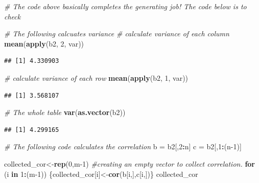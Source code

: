 \documentclass[]{book}
\newenvironment{Shaded}{\begin{snugshade}}{\end{snugshade}}
\newcommand{\CommentTok}[1]{\textcolor[rgb]{0.56,0.35,0.01}{\textit{#1}}}
\newcommand{\ControlFlowTok}[1]{\textcolor[rgb]{0.13,0.29,0.53}{\textbf{#1}}}
\newcommand{\DecValTok}[1]{\textcolor[rgb]{0.00,0.00,0.81}{#1}}
\newcommand{\KeywordTok}[1]{\textcolor[rgb]{0.13,0.29,0.53}{\textbf{#1}}}
\newcommand{\NormalTok}[1]{#1}
\newcommand{\OperatorTok}[1]{\textcolor[rgb]{0.81,0.36,0.00}{\textbf{#1}}}
\newcommand{\StringTok}[1]{\textcolor[rgb]{0.31,0.60,0.02}{#1}}
\begin{document}
\begin{Shaded}
\begin{Highlighting}[]
\CommentTok{# The code above basically completes the generating job! The code below is to check }

\CommentTok{# The following calcuates variance}
\CommentTok{# calculate variance of each column}
\KeywordTok{mean}\NormalTok{(}\KeywordTok{apply}\NormalTok{(b2, }\DecValTok{2}\NormalTok{, var))}
\end{Highlighting}
\end{Shaded}

\begin{verbatim}
## [1] 4.330903
\end{verbatim}

\begin{Shaded}
\begin{Highlighting}[]
\CommentTok{# calculate variance of each row}
\KeywordTok{mean}\NormalTok{(}\KeywordTok{apply}\NormalTok{(b2, }\DecValTok{1}\NormalTok{, var))}
\end{Highlighting}
\end{Shaded}

\begin{verbatim}
## [1] 3.568107
\end{verbatim}

\begin{Shaded}
\begin{Highlighting}[]
\CommentTok{# The whole table}
\KeywordTok{var}\NormalTok{(}\KeywordTok{as.vector}\NormalTok{(b2))}
\end{Highlighting}
\end{Shaded}

\begin{verbatim}
## [1] 4.299165
\end{verbatim}

\begin{Shaded}
\begin{Highlighting}[]
\CommentTok{# The following code calculates the correlation }
\NormalTok{b =}\StringTok{ }\NormalTok{b2[,}\DecValTok{2}\OperatorTok{:}\NormalTok{n]}
\NormalTok{c =}\StringTok{ }\NormalTok{b2[,}\DecValTok{1}\OperatorTok{:}\NormalTok{(n}\DecValTok{-1}\NormalTok{)]}

\NormalTok{collected_cor<-}\KeywordTok{rep}\NormalTok{(}\DecValTok{0}\NormalTok{,m}\DecValTok{-1}\NormalTok{) }\CommentTok{#creating an empty vector to collect correlation. }
\ControlFlowTok{for}\NormalTok{ (i }\ControlFlowTok{in} \DecValTok{1}\OperatorTok{:}\NormalTok{(m}\DecValTok{-1}\NormalTok{))}
\NormalTok{\{collected_cor[i]<-}\KeywordTok{cor}\NormalTok{(b[i,],c[i,])\}}
\NormalTok{collected_cor}
\end{Highlighting}
\end{Shaded}
\end{document}
